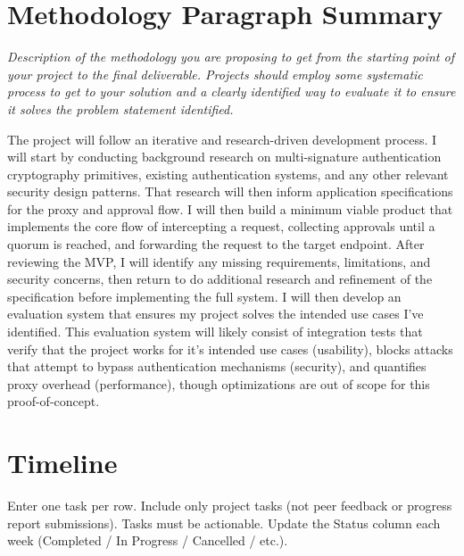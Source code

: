 \documentclass[12pt]{article}
\newcommand{\instruction}[1]{{\small\itshape #1}}
\begin{document}
\section*{Methodology Paragraph Summary}

\instruction{Description of the methodology you are proposing to get from the starting point of your project to the final deliverable. Projects should employ some systematic process to get to your solution and a clearly identified way to evaluate it to ensure it solves the problem statement identified.}

The project will follow an iterative and research-driven development process. I will start by conducting background research on multi-signature authentication cryptography primitives, existing authentication systems, and any other relevant security design patterns. That research will then inform application specifications for the proxy and approval flow. I will then build a minimum viable product that implements the core flow of intercepting a request, collecting approvals until a quorum is reached, and forwarding the request to the target endpoint. After reviewing the MVP, I will identify any missing requirements, limitations, and security concerns, then return to do additional research and refinement of the specification before implementing the full system. I will then develop an evaluation system that ensures my project solves the intended use cases I've identified. This evaluation system will likely consist of integration tests that verify that the project works for it's intended use cases (usability), blocks attacks that attempt to bypass authentication mechanisms (security), and quantifies proxy overhead (performance), though optimizations are out of scope for this proof-of-concept.

\section*{Timeline}

{\small Enter one task per row. Include only project tasks (not peer feedback
or progress report submissions). Tasks must be actionable. Update the Status
column each week (Completed / In Progress / Cancelled / etc.).}
\end{document}
